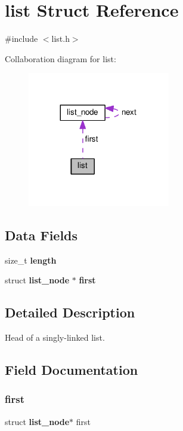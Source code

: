 \section{list Struct Reference}
\label{structlist}


{\ttfamily \#include $<$list.\+h$>$}



Collaboration diagram for list\+:\nopagebreak
\begin{figure}[H]
\begin{center}
\leavevmode
\includegraphics[width=176pt]{structlist__coll__graph}
\end{center}
\end{figure}
\subsection*{Data Fields}
\begin{DoxyCompactItemize}
\item 
size\+\_\+t \textbf{ length}
\item 
struct \textbf{ list\+\_\+node} $\ast$ \textbf{ first}
\end{DoxyCompactItemize}


\subsection{Detailed Description}
Head of a singly-\/linked list. 

\subsection{Field Documentation}
\mbox{\label{structlist_a15417ebe69a6b33324e8286dde558146}} 
\subsubsection{first}
{\footnotesize\ttfamily struct \textbf{ list\+\_\+node}$\ast$ first}

